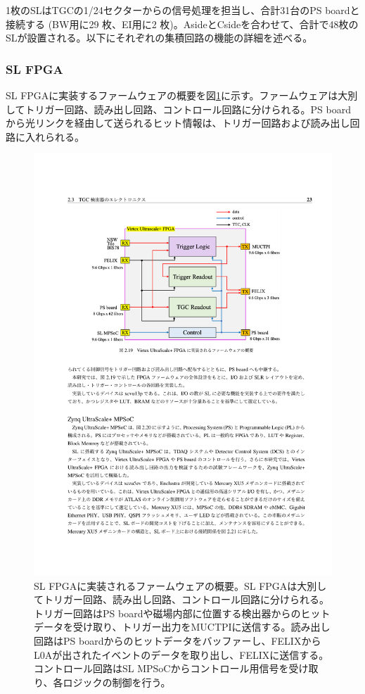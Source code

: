 1枚のSLはTGCの1/24セクターからの信号処理を担当し、合計31台のPS boardと接続する (BW用に29 枚、EI用に2 枚)。AsideとCsideを合わせて、合計で48枚のSLが設置される。以下にそれぞれの集積回路の機能の詳細を述べる。

    \subsubsection{SL FPGA}
SL FPGAに実装するファームウェアの概要を図\ref{SL_FW_overview}に示す。ファームウェアは大別してトリガー回路、読み出し回路、コントロール回路に分けられる。PS boardから光リンクを経由して送られるヒット情報は、トリガー回路および読み出し回路に入れられる。

\begin{figure} 
\centering
\includegraphics[width=16cm]{fig/Intro/SL_FW_overview.pdf}
\caption[SL FPGAに実装されるファームウェアの概要]{SL FPGAに実装されるファームウェアの概要\cite{mt_mishima}。SL FPGAは大別してトリガー回路、読み出し回路、コントロール回路に分けられる。トリガー回路はPS boardや磁場内部に位置する検出器からのヒットデータを受け取り、トリガー出力をMUCTPIに送信する。読み出し回路はPS boardからのヒットデータをバッファーし、FELIXからL0Aが出されたイベントのデータを取り出し、FELIXに送信する。コントロール回路はSL MPSoCからコントロール用信号を受け取り、各ロジックの制御を行う。}
\label{SL_FW_overview}
\end{figure}

